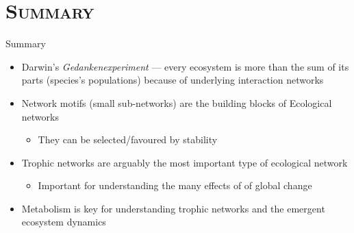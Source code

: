\section{\scshape Summary}
  \begin{frame}{Summary}
  
    \begin{itemize}[<+->] \setlength{\itemindent}{0em} \itemsep10pt

        \item Darwin's {\it Gedankenexperiment} --- every ecosystem is more than the sum of its parts (species's populations) because of underlying interaction networks
        
        \item Network motifs (small sub-networks) are the building blocks of Ecological networks
        \begin{itemize}
          \item They can be selected/favoured by stability
        \end{itemize} 
    
        \item Trophic networks are arguably the most important type of ecological network
        \begin{itemize}
          \item Important for understanding the many effects of of global change
        \end{itemize}

        \item Metabolism is key for understanding trophic networks and the emergent ecosystem dynamics
        
    \end{itemize}
  
  \end{frame}  

